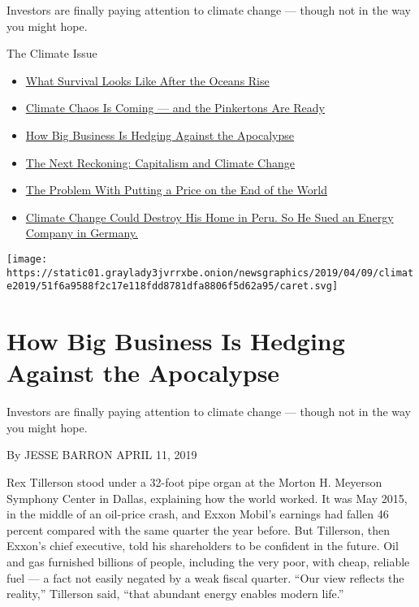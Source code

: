 Investors are finally paying attention to climate change --- though not
in the way you might hope.

The Climate Issue

\begin{itemize}
\tightlist
\item
  \href{https://www.nytimes3xbfgragh.onion/interactive/2019/04/11/magazine/climate-change-bangladesh-scavenging.html}{What
  Survival Looks Like After the Oceans Rise}
\item
  \href{https://www.nytimes3xbfgragh.onion/interactive/2019/04/10/magazine/climate-change-pinkertons.html}{Climate
  Chaos Is Coming --- and the Pinkertons Are Ready}
\item
  \href{https://www.nytimes3xbfgragh.onion/interactive/2019/04/11/magazine/climate-change-exxon-renewable-energy.html}{How
  Big Business Is Hedging Against the Apocalypse}
\item
  \href{https://www.nytimes3xbfgragh.onion/interactive/2019/04/09/magazine/climate-change-capitalism.html}{The
  Next Reckoning: Capitalism and Climate Change}
\item
  \href{https://www.nytimes3xbfgragh.onion/interactive/2019/04/09/magazine/climate-change-politics-economics.html}{The
  Problem With Putting a Price on the End of the World}
\item
  \href{https://www.nytimes3xbfgragh.onion/interactive/2019/04/09/magazine/climate-change-peru-law.html}{Climate
  Change Could Destroy His Home in Peru. So He Sued an Energy Company in
  Germany.}
\end{itemize}

\protect\hyperlink{}{} \protect\hyperlink{}{}

\texttt{[image: https://static01.graylady3jvrrxbe.onion/newsgraphics/2019/04/09/climate2019/51f6a9588f2c17e118fdd8781dfa8806f5d62a95/caret.svg]}

\hypertarget{how-big-business-is-hedging-against-the-apocalypse-1}{%
\section{How Big Business Is Hedging Against the
Apocalypse}\label{how-big-business-is-hedging-against-the-apocalypse-1}}

Investors are finally paying attention to climate change --- though not
in the way you might hope.

By JESSE BARRON APRIL 11, 2019

Rex Tillerson stood under a 32-foot pipe organ at the Morton H. Meyerson
Symphony Center in Dallas, explaining how the world worked. It was May
2015, in the middle of an oil-price crash, and Exxon Mobil's earnings
had fallen 46 percent compared with the same quarter the year before.
But Tillerson, then Exxon's chief executive, told his shareholders to be
confident in the future. Oil and gas furnished billions of people,
including the very poor, with cheap, reliable fuel --- a fact not easily
negated by a weak fiscal quarter. ``Our view reflects the reality,''
Tillerson said, ``that abundant energy enables modern life.''

